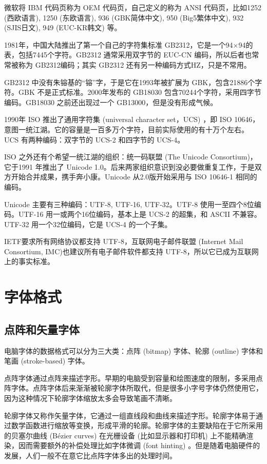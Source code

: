 微软\indexMSFT 将 IBM 代码页称为 OEM 代码页，自己定义的称为 ANSI 代码页，比如1252 (西欧语言), 1250 (东欧语言), 936 (GBK简体中文), 950 (Big5繁体中文), 932 (SJIS日文), 949 (EUC-KR韩文) 等。

1981年，中国大陆推出了第一个自己的字符集标准 GB2312，它是一个94×94的表，包括7445个字符。GB2312 通常采用双字节的 EUC-CN 编码，所以后者也常常被称为 GB2312编码；其实 GB2312 还有另一种编码方式HZ，只是不常用。

GB2312 中没有朱镕基的“镕”字，于是它在1993年被扩展为 GBK，包含21886个字符。GBK 不是正式标准。2000年发布的 GB18030 包含70244个字符，采用四字节编码。GB18030 之前还出现过一个 GB13000，但是没有形成气候。

1990年 ISO 推出了通用字符集 (universal character set，UCS) ，即 ISO 10646，意图一统江湖。它的容量是一百多万个字符，目前实际使用的有十万个左右。UCS 有两种编码：双字节的 UCS-2 和四字节的 UCS-4。

ISO 之外还有个希望一统江湖的组织：统一码联盟 (The Unicode Consortium)\indexUnicode ，它于1991 年推出了 Unicode 1.0。后来两家组织意识到没必要做重复工作，于是双方开始合并成果，携手奔小康。Unicode 从2.0版开始采用与 ISO 10646-1 相同的编码。

Unicode 主要有三种编码：UTF-8, UTF-16, UTF-32。UTF-8 使用一至四个8位编码。UTF-16 用一或两个16位编码，基本上是 UCS-2 的超集，和 ASCII 不兼容。UTF-32 用一个32位编码，它是 UCS-4 的一个子集。

IETF\indexIETF 要求所有网络协议都支持 UTF-8，互联网电子邮件联盟 (Internet Mail Consortium, IMC)\indexIMC 也建议所有电子邮件软件都支持 UTF-8，所以它已成为互联网上的事实标准。

\section{字体格式}

\subsection{点阵和矢量字体}

电脑字体的数据格式可以分为三大类：点阵 (bitmap) 字体、轮廓 (outline) 字体和笔画 (stroke-based) 字体。

点阵字体通过点阵来描述字形。早期的电脑受到容量和绘图速度的限制，多采用点阵字体。点阵字体后来渐渐被轮廓字体所取代，但是很多小字号字体仍然使用它，因为这种情况下轮廓字体缩放太多会导致笔画不清晰。

轮廓字体又称作矢量字体，它通过一组直线段和曲线来描述字形。轮廓字体易于通过数学函数进行缩放等变换，形成平滑的轮廓。轮廓字体的主要缺陷在于它所采用的贝塞尔曲线 (Bézier curves) 在光栅设备 (比如显示器和打印机) 上不能精确渲染，因而需要额外的补偿处理比如字体微调 (font hinting) 。但是随着电脑硬件的发展，人们一般不在意它比点阵字体多出的处理时间。

